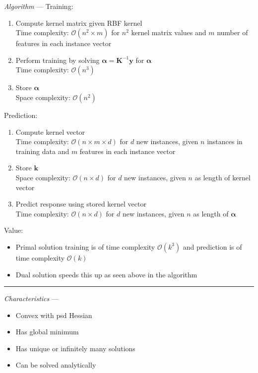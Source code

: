\emph{Algorithm} --- 
Training:
\begin{enumerate}
    \item Compute kernel matrix given RBF kernel\\
    Time complexity: $\mathcal{O}(n^2 \times m)$ for $n^2$ kernel matrix values and $m$ number of features in each instance vector
    \item Perform training by solving $\boldsymbol{\alpha} = \boldsymbol{K}^{-1} \boldsymbol{y}$ for $\boldsymbol{\alpha}$\\
    Time complexity: $\mathcal{O}(n^3)$ 
    \item Store $\boldsymbol{\alpha}$\\
    Space complexity: $\mathcal{O}(n^2)$ 
\end{enumerate}
Prediction:
\begin{enumerate}
    \item Compute kernel vector\\
    Time complexity: $\mathcal{O}(n \times m \times d)$ for $d$ new instances, given $n$ instances in training data and $m$ features in each instance vector
    \item Store $\boldsymbol{k}$\\
    Space complexity: $\mathcal{O}(n \times d)$ for $d$ new instances, given $n$ as length of kernel vector
    \item Predict response using stored kernel vector\\
    Time complexity: $\mathcal{O}(n \times d)$ for $d$ new instances, given $n$ as length of $\boldsymbol{\alpha}$
\end{enumerate}
Value:
\begin{itemize}
    \item Primal solution training is of time complexity $\mathcal{O}(k^3)$ and prediction is of time complexity $\mathcal{O}(k)$
    \item Dual solution speeds this up as seen above in the algorithm
\end{itemize}

{\color{lightgray}\hrule height 0.001mm}

\emph{Characteristics} --- 
\begin{itemize}
    \item Convex with psd Hessian
    \item Has global minimum
    \item Has unique or infinitely many solutions
    \item Can be solved analytically 
\end{itemize}

